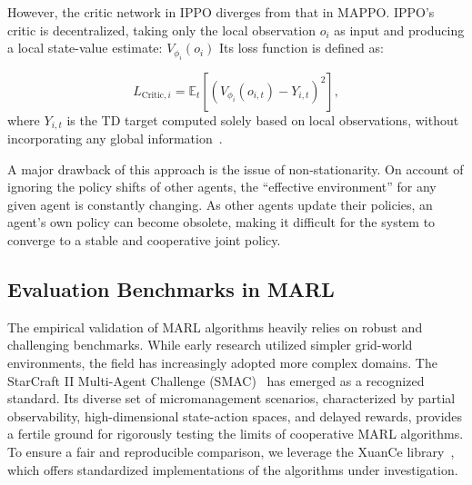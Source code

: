 However, the critic network in IPPO diverges from that in MAPPO. IPPO's critic is decentralized, taking only the local observation $o_i$ as input and producing a local state-value estimate:
$
V_{\phi_i}(o_i)
$
Its loss function is defined as:

\begin{equation}
    L_{\text{Critic},i} = \mathbb{E}_t\left[ (V_{\phi_i}(o_{i,t}) - Y_{i,t})^2 \right],
\end{equation}
where $Y_{i,t}$ is the TD target computed solely based on local observations, without incorporating any global information~\cite{wittIndependentLearningAll2020}.

A major drawback of this approach is the issue of non-stationarity. On account of ignoring the policy shifts of other agents, the ``effective environment'' for any given agent is constantly changing. As other agents update their policies, an agent's own policy can become obsolete, making it difficult for the system to converge to a stable and cooperative joint policy.

\subsection{Evaluation Benchmarks in MARL}
The empirical validation of MARL algorithms heavily relies on robust and challenging benchmarks. While early research utilized simpler grid-world environments, the field has increasingly adopted more complex domains. The StarCraft II Multi-Agent Challenge (SMAC)~\cite{samvelyanStarCraftMultiAgentChallenge2019} has emerged as a recognized standard. Its diverse set of micromanagement scenarios, characterized by partial observability, high-dimensional state-action spaces, and delayed rewards, provides a fertile ground for rigorously testing the limits of cooperative MARL algorithms. To ensure a fair and reproducible comparison, we leverage the XuanCe library~\cite{liuXuanCeComprehensiveUnified2023}, which offers standardized implementations of the algorithms under investigation.
